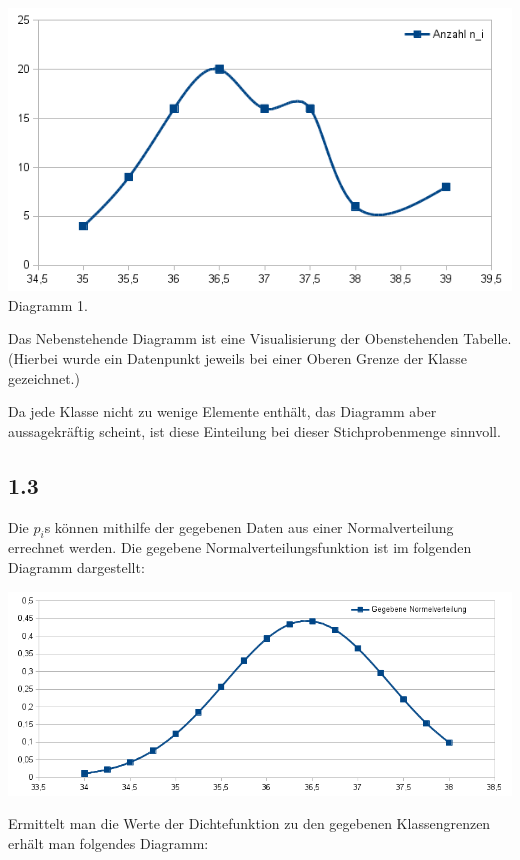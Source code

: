 \documentclass[12pt,a4paper]{article}
\begin{document}
\noindent
\begin{minipage}{0.6\textwidth}
\includegraphics[scale=0.56]{1_2_diagram}
Diagramm 1.
\\
\end{minipage}
\begin{minipage}{0.4\textwidth}
Das Nebenstehende Diagramm ist eine Visualisierung der Obenstehenden Tabelle. (Hierbei wurde ein Datenpunkt jeweils bei einer Oberen Grenze der Klasse gezeichnet.)

Da jede Klasse nicht zu wenige Elemente enthält, das Diagramm aber aussagekräftig scheint, ist diese Einteilung bei dieser Stichprobenmenge sinnvoll.
\end{minipage}

\subsection*{1.3}
Die $p_i$s können mithilfe der gegebenen Daten aus einer Normalverteilung errechnet werden. Die gegebene Normalverteilungsfunktion ist im folgenden Diagramm dargestellt:

\includegraphics[scale=0.7]{1_3_normvert}

Ermittelt man die Werte der Dichtefunktion zu den gegebenen Klassengrenzen erhält man folgendes Diagramm:
\end{document}
